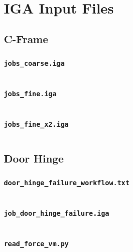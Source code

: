 \documentclass[12pt,report,justified]{SANDreport}
\begin{document}
\chapter{IGA Input Files}

\section{C-Frame}

\subsection{\tt{jobs\_coarse.iga}}
\inputminted[stripnl=false]{json}{cframe_modal/jobs_coarse.json}

\subsection{\tt{jobs\_fine.iga}}
\inputminted[stripnl=false]{json}{cframe_modal/jobs_fine.json}

\subsection{\tt{jobs\_fine\_x2.iga}}
\inputminted[stripnl=false]{json}{cframe_modal/jobs_fine_x2.json}

\section{Door Hinge}

\subsection{\tt{door\_hinge\_failure\_workflow.txt}}
\inputminted[stripnl=false]{text}{door_hinge/door_hinge_failure_workflow.txt}

\subsection{\tt{job\_door\_hinge\_failure.iga}}
\inputminted[stripnl=false]{json}{door_hinge/job_door_hinge_failure.json}

\subsection{\tt{read\_force\_vm.py}}
\inputminted[stripnl=false]{python}{door_hinge/read_force_vm.py}
\end{document}
